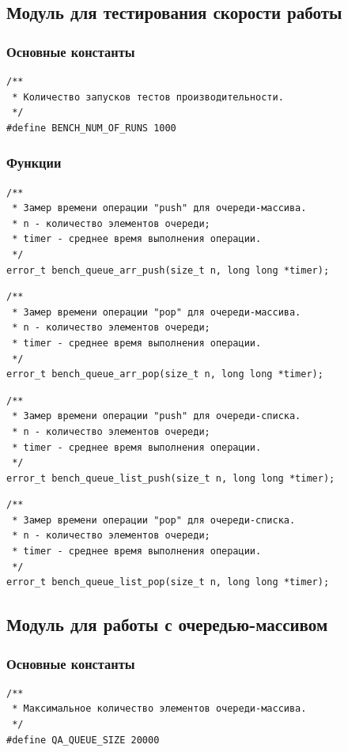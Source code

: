 \documentclass[a4paper,12pt]{extarticle}
\begin{document}
\subsection{Модуль для тестирования скорости работы}
\subsubsection{Основные константы}
\begin{verbatim}
/**
 * Количество запусков тестов производительности.
 */
#define BENCH_NUM_OF_RUNS 1000
\end{verbatim}

\subsubsection{Функции}
\begin{verbatim}
/**
 * Замер времени операции "push" для очереди-массива.
 * n - количество элементов очереди;
 * timer - среднее время выполнения операции.
 */
error_t bench_queue_arr_push(size_t n, long long *timer);
\end{verbatim}

\begin{verbatim}
/**
 * Замер времени операции "pop" для очереди-массива.
 * n - количество элементов очереди;
 * timer - среднее время выполнения операции.
 */
error_t bench_queue_arr_pop(size_t n, long long *timer);
\end{verbatim}

\begin{verbatim}
/**
 * Замер времени операции "push" для очереди-списка.
 * n - количество элементов очереди;
 * timer - среднее время выполнения операции.
 */
error_t bench_queue_list_push(size_t n, long long *timer);
\end{verbatim}

\begin{verbatim}
/**
 * Замер времени операции "pop" для очереди-списка.
 * n - количество элементов очереди;
 * timer - среднее время выполнения операции.
 */
error_t bench_queue_list_pop(size_t n, long long *timer);
\end{verbatim}

\subsection{Модуль для работы с очередью-массивом}
\subsubsection{Основные константы}
\begin{verbatim}
/**
 * Максимальное количество элементов очереди-массива.
 */
#define QA_QUEUE_SIZE 20000
\end{verbatim}
\end{document}
